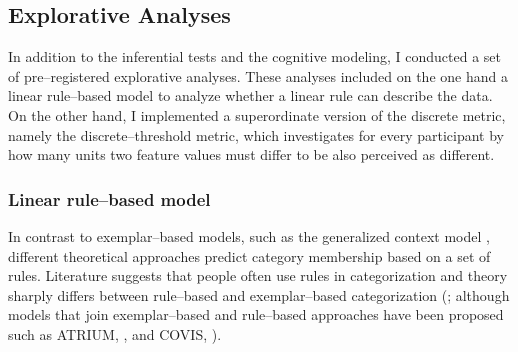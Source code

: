 \documentclass[a4paper,man,natbib]{apa6}
\begin{document}
\subsection{Explorative Analyses}
In addition to the inferential tests and the cognitive modeling, I conducted a set of pre--registered explorative analyses. These analyses included on the one hand a linear rule--based model to analyze whether a linear rule can describe the data. On the other hand, I implemented a superordinate version of the discrete metric, namely the discrete--threshold metric, which investigates for every participant by how many units two feature values must differ to be also perceived as different.

\subsubsection{Linear rule--based model}
In contrast to exemplar--based models, such as the generalized context model \citep{nosofsky1986attention}, different theoretical approaches predict category membership based on a set of rules. Literature suggests that people often use rules in categorization \citep{restle1962selection, tom1968attention, rouder2006comparing} and theory sharply differs between rule--based and exemplar--based categorization (\citealp{rouder2006comparing}; although models that join exemplar--based and rule--based approaches have been proposed such as ATRIUM, \citealp{erickson1998rules}, and COVIS, \citealp{ashby2011covis}). 
\end{document}
